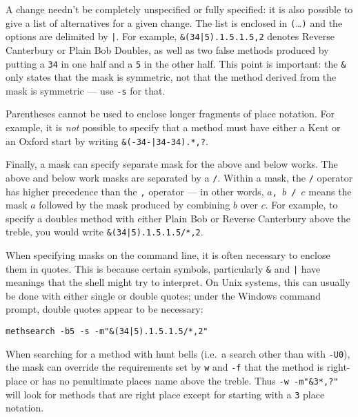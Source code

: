 \documentclass[a4paper,11pt,oneside]{book}
\makeatletter
\newcommand{\symidx}[2]{} %
\makeatother
\begin{document}
A change needn't be completely unspecified or fully specified: it is also
possible to give a list of alternatives for a given change.  The list is 
enclosed in \verb+(+\ldots\verb+)+ 
and the options are delimited by \verb+|+.\symidx{"|}{method mask}  
For example, \verb+&(34|5).1.5.1.5,2+ denotes Reverse Canterbury
or Plain Bob Doubles, as well as two false methods produced by putting a
\verb+34+ in one half and a \verb+5+ in the other half.  This point is 
important: the \verb+&+ only states that the mask is symmetric, not that
the method derived from the mask is symmetric --- use \verb+-s+ for that.

Parentheses cannot be used to enclose longer fragments of place notation.
For example, it is \textit{not} possible to specify that a method must have 
either a Kent or an Oxford 
start by writing \verb+&(-34-|34-34).*,?+.

Finally, a mask can specify separate mask for the above
and below works.  The above and below 
work masks are separated by a \verb+/+.\symidx{/}{method mask}
Within a mask, the \verb+/+ operator has higher 
precedence than the 
\verb+,+ operator --- in other words, 
\texttt{$a$, $b$ / $c$} means the mask $a$
followed by the mask produced by combining $b$ over $c$.  For example,
to specify a doubles method with either Plain Bob or Reverse Canterbury
above the treble, you would write \verb+&(34|5).1.5.1.5/*,2+.

When specifying masks on the command line, it is often necessary to enclose 
them in quotes.
This is because certain symbols, particularly \verb+&+ and
\verb+|+ have meanings that the shell might try to interpret.  On Unix systems,
this can usually be done with either single or double quotes; under the 
Windows command prompt, double quotes appear to be necessary:

\begin{Verbatim}
methsearch -b5 -s -m"&(34|5).1.5.1.5/*,2"
\end{Verbatim}

When searching for a method with hunt bells (i.e.\ a search other than with
\verb+-U0+), the mask can override the requirements set by \verb+w+ and
\verb+-f+ that the method is right-place or has no penultimate places name
above the treble.  Thus \verb+-w -m"&3*,?"+ will look for methods
that are right place except for starting with a \verb+3+ place notation.  
\end{document}
